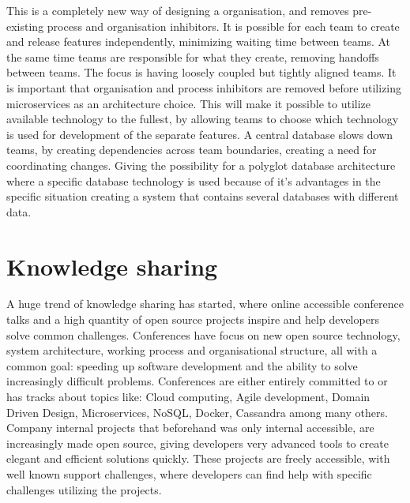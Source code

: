 This is a completely new way of designing a organisation, and removes pre-existing process and organisation inhibitors. It is possible for each team to create and release features independently, minimizing waiting time between teams. At the same time teams are responsible for what they create, removing handoffs between teams. The focus is having loosely coupled but tightly aligned teams\cite{kniberg2014spotify}.
It is important that organisation and process inhibitors are removed before utilizing microservices as an architecture choice. This will make it possible to utilize available technology to the fullest, by allowing teams to choose which technology is used for development of the separate features\cite{fowler2014polyglot}. A central database slows down teams, by creating dependencies across team boundaries, creating a need for coordinating changes. Giving the possibility for a polyglot database architecture where a specific database technology is used because of it's advantages in the specific situation creating a system that contains several databases with different data\cite{george2016it, fowler2014microservices}.

\section{Knowledge sharing}
A huge trend of knowledge sharing has started, where online accessible conference talks and a high quantity of open source projects inspire and help developers solve common challenges. Conferences have focus on new open source technology, system architecture, working process and organisational structure, all with a common goal: speeding up software development and the ability to solve increasingly difficult problems. Conferences are either entirely committed to or has tracks about topics like: Cloud computing, Agile development, Domain Driven Design, Microservices, NoSQL, Docker, Cassandra among many others\cite{george2016it}. Company internal projects that beforehand was only internal accessible, are increasingly made open source, giving developers very advanced tools to create elegant and efficient solutions quickly. These projects are freely accessible, with well known support challenges, where developers can find help with specific challenges utilizing the projects.

